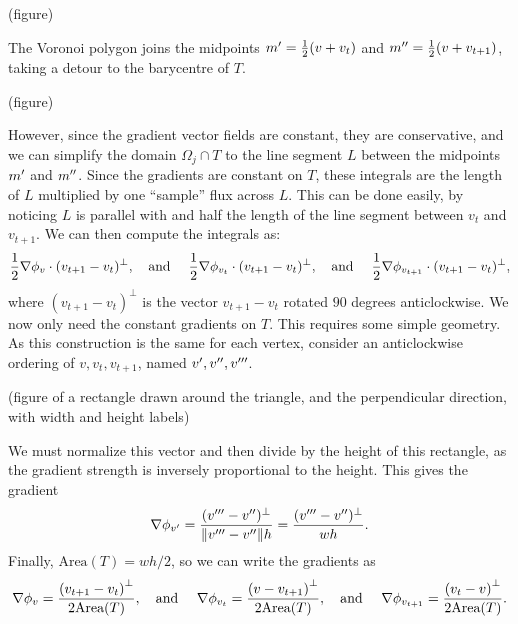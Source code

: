 \vskip 0.2in
(figure)
\vskip 0.2in

The Voronoi polygon joins the midpoints $m^{\prime} = \frac{1}{2}(v + v_t)$ and $m^{\prime\prime} = \frac{1}{2}(v + v_{t+1})$, taking a detour to the barycentre of $T$.

\vskip 0.2in
(figure)
\vskip 0.2in

However, since the gradient vector fields are constant, they are conservative, and we can simplify the domain $\Omega_j \cap T$ to the line segment $L$ between
the midpoints $m^{\prime}$ and $m^{\prime\prime}$. Since the gradients are constant on $T$, these integrals are the length of $L$ multiplied by one ``sample'' flux across $L$.
This can be done easily, by noticing $L$ is parallel with and half the length of the line segment between $v_t$ and $v_{t+1}$.
We can then compute the integrals as:
\begin{equation}\label{fvm_integrals_closed}
    \frac{1}{2}\nabla\phi_v\cdot(v_{t+1} - v_t)^\perp,\text{\quad and \quad}
    \frac{1}{2}\nabla\phi_{v_t}\cdot(v_{t+1} - v_t)^\perp,\text{\quad and \quad}
    \frac{1}{2}\nabla\phi_{v_{t+1}}\cdot(v_{t+1} - v_t)^\perp,
\end{equation}
where $(v_{t+1} - v_t)^\perp$ is the vector $v_{t+1} - v_t$ rotated $90$ degrees anticlockwise.
We now only need the constant gradients on $T$. This requires some simple geometry. As this construction is the same for each vertex, consider an anticlockwise ordering of $v,v_t,v_{t+1}$, named $v^{\prime},v^{\prime\prime},v^{\prime\prime\prime}$.

\vskip 0.2in
(figure of a rectangle drawn around the triangle, and the perpendicular direction, with width and height labels)
\vskip 0.2in

We must normalize this vector and then divide by the height of this rectangle, as the gradient strength is inversely proportional to the height.
This gives the gradient
$$
    \nabla\phi_{v^{\prime}} = \frac{(v^{\prime\prime\prime} - v^{\prime\prime})^\perp}{\norm{v^{\prime\prime\prime} - v^{\prime\prime}}h} = \frac{(v^{\prime\prime\prime} - v^{\prime\prime})^\perp}{wh}.
$$
Finally, $\text{Area}(T) = wh/2$, so we can write the gradients as
\begin{equation}\label{fvm_gradients}
    \nabla\phi_v = \frac{\left(v_{t+1} - v_t\right)^\perp}{2\text{Area}(T)},\text{\quad and \quad}
    \nabla\phi_{v_t} = \frac{\left(v - v_{t+1}\right)^\perp}{2\text{Area}(T)},\text{\quad and \quad}
    \nabla\phi_{v_{t+1}} = \frac{\left(v_t - v\right)^\perp}{2\text{Area}(T)}.
\end{equation}

